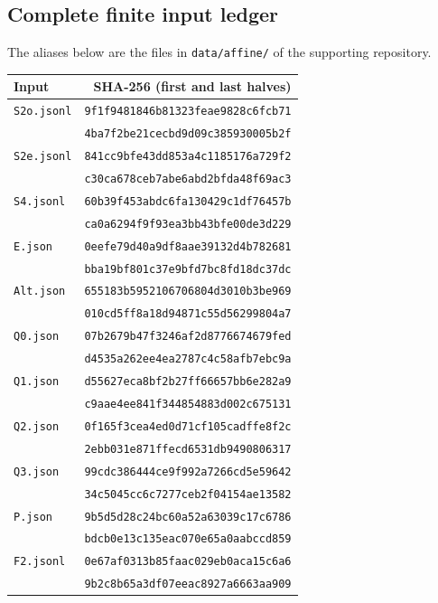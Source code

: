 \subsection{Complete finite input ledger}
\label{templates:ledger}
The aliases below are the files in \texttt{data/affine/} of the supporting repository.
\begingroup\footnotesize\begin{longtable}{lr}
Input & SHA-256 (first and last halves)\\\hline\endhead
\texttt{S2o.jsonl} & \texttt{9f1f9481846b81323feae9828c6fcb71}\\
 & \texttt{4ba7f2be21cecbd9d09c385930005b2f}\\[3pt]
\texttt{S2e.jsonl} & \texttt{841cc9bfe43dd853a4c1185176a729f2}\\
 & \texttt{c30ca678ceb7abe6abd2bfda48f69ac3}\\[3pt]
\texttt{S4.jsonl} & \texttt{60b39f453abdc6fa130429c1df76457b}\\
 & \texttt{ca0a6294f9f93ea3bb43bfe00de3d229}\\[3pt]
\texttt{E.json} & \texttt{0eefe79d40a9df8aae39132d4b782681}\\
 & \texttt{bba19bf801c37e9bfd7bc8fd18dc37dc}\\[3pt]
\texttt{Alt.json} & \texttt{655183b5952106706804d3010b3be969}\\
 & \texttt{010cd5ff8a18d94871c55d56299804a7}\\[3pt]
\texttt{Q0.json} & \texttt{07b2679b47f3246af2d8776674679fed}\\
 & \texttt{d4535a262ee4ea2787c4c58afb7ebc9a}\\[3pt]
\texttt{Q1.json} & \texttt{d55627eca8bf2b27ff66657bb6e282a9}\\
 & \texttt{c9aae4ee841f344854883d002c675131}\\[3pt]
\texttt{Q2.json} & \texttt{0f165f3cea4ed0d71cf105cadffe8f2c}\\
 & \texttt{2ebb031e871ffecd6531db9490806317}\\[3pt]
\texttt{Q3.json} & \texttt{99cdc386444ce9f992a7266cd5e59642}\\
 & \texttt{34c5045cc6c7277ceb2f04154ae13582}\\[3pt]
\texttt{P.json} & \texttt{9b5d5d28c24bc60a52a63039c17c6786}\\
 & \texttt{bdcb0e13c135eac070e65a0aabccd859}\\[3pt]
\texttt{F2.jsonl} & \texttt{0e67af0313b85faac029eb0aca15c6a6}\\
 & \texttt{9b2c8b65a3df07eeac8927a6663aa909}\\[3pt]

\end{longtable}
